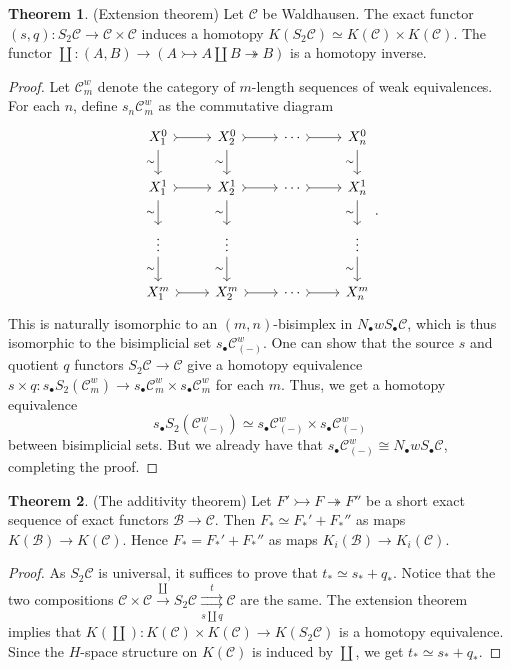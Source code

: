 \documentclass[10pt,letterpaper,cm]{nupset}
\theoremstyle{definition}
\theoremstyle{theorem}
\newtheorem{theorem}{Theorem}
\theoremstyle{remark}
\newcommand{\1}{\mathbf{1}}
\renewcommand{\b}{\mathscr{B}}
\renewcommand{\c}{\mathscr{C}}
\newcommand{\0}{\vec 0}
\begin{document}
\begin{theorem}{(Extension theorem)}
Let $\c$ be Waldhausen. The exact functor $(s, q) : S_2 \c \to \c \times \c$ induces  a homotopy $K(S_2\c) \simeq K(\c) \times K(\c)$. The functor $\coprod : (A, B) \to (A \rightarrowtail A \coprod B \twoheadrightarrow  B)$ is a homotopy inverse.
\end{theorem}
\begin{proof}
Let $\c^w_m$ denote the category of $m$-length sequences of weak equivalences. For each $n$, define $s_n\c^w_m$ as the commutative diagram
\[
\begin{tikzcd}
 X_1^0 \arrow[d, "\sim"'] \arrow[r, tail] & X_2^0 \arrow[r, tail] \arrow[d, "\sim"'] & \cdots \arrow[r, tail] & X_n^0 \arrow[d, "\sim"'] \\
X_1^1 \arrow[d, "\sim"'] \arrow[r, tail] & X_2^1 \arrow[r, tail] \arrow[d, "\sim"'] & \cdots \arrow[r, tail] & X_n^1 \arrow[d, "\sim"'] \\
  \vdots \arrow[d, "\sim"'] & \vdots \arrow[d, "\sim"'] &  & \vdots \arrow[d, "\sim"'] \\
 X_1^m \arrow[r, tail] & X_2^m \arrow[r, tail] & \cdots \arrow[r, tail] & X_n^m
\end{tikzcd}
.\]
This is naturally isomorphic to an $(m, n)$-bisimplex in $N_{\bullet}w S_{\bullet}\c$, which is thus isomorphic to the bisimplicial set $s_{\bullet}\c^w_{(-)}$. One can show that the source $s$ and quotient $q$ functors  $S_2 \c \to \c$ give a homotopy equivalence $s \times q : s_{\bullet}S_2(\c^w_m) \to s_{\bullet}\c^w_m \times s_{\bullet}\c^w_m$ for each $m$. Thus, we get a homotopy equivalence  $$s_{\bullet}S_2(\c^w_{(-)}) \simeq s_{\bullet}\c^w_{(-)} \times s_{\bullet}\c^w_{(-)}$$ between bisimplicial sets. But we already have that $s_{\bullet}\c^w_{(-)} \cong N_{\bullet}w S_{\bullet}\c$, completing the proof.
\end{proof}

\begin{theorem}{(The additivity theorem)}
Let $F' \rightarrowtail F \twoheadrightarrow F''$ be a short exact sequence of exact functors $\b \to \c$. Then $F_{\ast} \simeq F_{\ast}' + F_{\ast}''$ as maps $K(\b) \to K(\c)$. Hence $F_{\ast} = F_{\ast}' + F_{\ast}''$ as maps $K_i(\b) \to K_i(\c)$. 
\end{theorem}
\begin{proof}
As $S_2\c$ is universal, it suffices to prove that $t_{\ast}  \simeq s_{\ast} + q_{\ast}$. Notice that the two compositions $\c \times \c \overset{\coprod}{\longrightarrow} S_2 \c  \underset{s \coprod q}{\overset{t}{\rightrightarrows}} \c$ are the same. The extension theorem implies that $K(\coprod): K(\c) \times K(\c) \to K(S_2 \c)$ is a homotopy equivalence. Since the $H$-space structure on $K(\c)$ is induced by $\coprod$, we get $t_{\ast}  \simeq s_{\ast} + q_{\ast}$. 
\end{proof}
\end{document}
